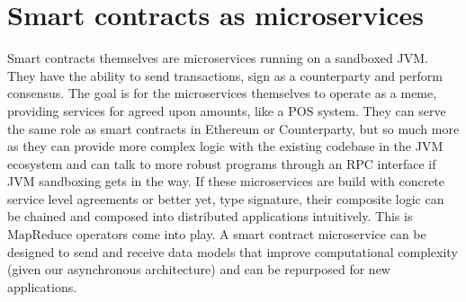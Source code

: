 \documentclass{article}
\begin{document}
\section{Smart contracts as microservices}
Smart contracts themselves are microservices running on a sandboxed JVM. They have the ability to send transactions, sign as a counterparty and perform consensus. The goal is for the microservices themselves to operate as a meme, providing services for agreed upon amounts, like a POS system. They can serve the same role as smart contracts in Ethereum or Counterparty, but so much more as they can provide more complex logic with the existing codebase in the JVM ecosystem and can talk to more robust programs through an RPC interface if JVM sandboxing gets in the way. If these microservices are build with concrete service level agreements or better yet, type signature, their composite logic can be chained and composed into distributed applications intuitively. This is MapReduce operators come into play. A smart contract microservice can be designed to send and receive data models that improve computational complexity (given our asynchronous architecture) and can be repurposed for new applications.


\end{document}
